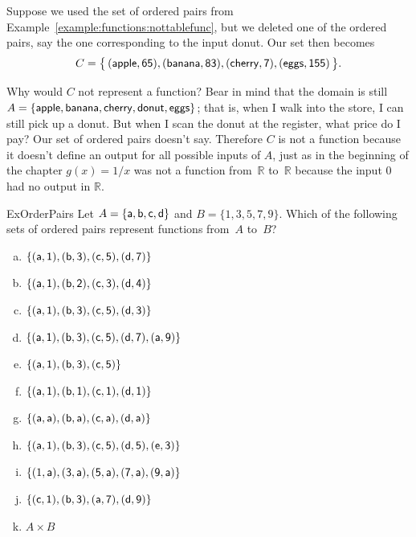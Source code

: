 Suppose  we used the set of ordered pairs from Example~\ref{example:functions:nottablefunc}, but we deleted one of the ordered pairs, say the one corresponding to the input donut.  Our set then becomes
 $$ C = \bigl\{\, (\sf{apple}, 65), 
 (\sf{banana}, 83), 
 (\sf{cherry}, 7),
  (\sf{eggs}, 155) \,\bigr\} .$$

Why would $C$ not represent a function?  Bear in mind that the domain is still $A = \{  \sf{apple} , \sf{banana} , \sf{cherry} , \sf{donut} , \sf{eggs} \}$; that is, when I walk into the store, I can still pick up a donut.  But when I scan the donut at the register, what price do I pay?  Our set of ordered pairs doesn't say.  Therefore $C$ is not a function because it doesn't define an output for all possible inputs of $A$, just as in the beginning of the chapter $g(x) = 1/x$ was not a function from~$\mathbb{R}$ to~$\mathbb{R}$ because the input 0 had no output in $\mathbb{R}$.  

\begin{exercise}{ExOrderPairs}
Let  $A = \{ \sf{a}, \sf{b}, \sf{c}, \sf{d} \}$ and  $B = \{1,3,5,7,9\}$.
Which of the following sets of ordered pairs represent functions from~$A$ to~$B$?

\begin{multicols}{2}
\begin{enumerate}[a.]
\item \label{WhichAreFuncsEx-a1b3c5d7e9}
$\{ (\sf{a}, 1), (\sf{b}, 3), (\sf{c}, 5), (\sf{d}, 7) \}$
\item \label{WhichAreFuncsEx-a1b2c3d4e5}
$\{ (\sf{a}, 1), (\sf{b}, 2), (\sf{c}, 3), (\sf{d}, 4) \}$
\item \label{WhichAreFuncsEx-a1b3c5d3e1}
$\{ (\sf{a}, 1), (\sf{b}, 3), (\sf{c}, 5), (\sf{d}, 3) \}$
\item \label{WhichAreFuncsEx-a1b3c5d7e9a11}
$\{ (\sf{a}, 1), (\sf{b}, 3), (\sf{c}, 5), (\sf{d}, 7), (\sf{a},9) \}$
\item \label{WhichAreFuncsEx-a1b3c5e7}
$\{ (\sf{a}, 1), (\sf{b}, 3), (\sf{c}, 5) \}$
\item \label{WhichAreFuncsEx-a1b1c1d1e1}
$\{ (\sf{a}, 1), (\sf{b}, 1), (\sf{c}, 1), (\sf{d}, 1) \}$
\item \label{WhichAreFuncsEx-aabacadaea}
$\{ (\sf{a}, \sf{a}), (\sf{b}, \sf{a}), (\sf{c}, \sf{a}), (\sf{d}, \sf{a}) \}$
\item \label{WhichAreFuncsEx-a1b3c5d5e3a1}
$\{ (\sf{a}, 1), (\sf{b}, 3), (\sf{c}, 5), (\sf{d}, 5), (\sf{e}, 3) \}$
\item \label{WhichAreFuncsEx-1a3a5a7a9a11a}
$\{ (1, \sf{a}), (3, \sf{a}), (5, \sf{a}), (7, \sf{a}), (9, \sf{a}) \}$
\item \label{WhichAreFuncsEx-c1b3e5a7d9}
$\{ (\sf{c}, 1), (\sf{b}, 3), (\sf{a}, 7), (\sf{d},9) \}$
\item \label{WhichAreFuncsExACrossB}
$A \times B$
\end{enumerate}
\end{multicols}
\end{exercise}

